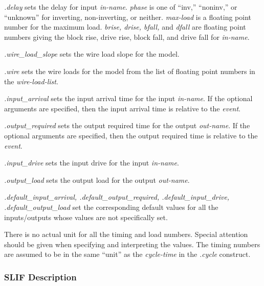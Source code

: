 {\begin{pespace}
\begin{description}
\item {\em .delay} sets the delay for input {\em in-name}.  {\em phase} is
one of ``{\sc inv},'' ``{\sc noninv},'' or ``{\sc unknown}'' for inverting,
non-inverting, or neither.  {\em max-load} is a floating point number for
the maximum load.  {\em brise, drise, bfall,} and {\em dfall} are floating
point numbers giving the block rise, drive rise, block fall, and drive fall
for {\em in-name}.

\item {\em .wire\_load\_slope} sets the wire load slope for the model.

\item {\em .wire} sets the wire loads for the model from the list of floating
point numbers in the {\em wire-load-list}.

\item {\em .input\_arrival} sets the input arrival time for the input {\em
in-name}.  If the optional arguments are specified, then the input arrival
time is relative to the {\em event}.

\item {\em .output\_required} sets the output required time for the output
{\em out-name}.  If the optional arguments are specified, then the output
required time is relative to the {\em event}.

\item {\em .input\_drive} sets the input drive for the input {\em in-name}.

\item {\em .output\_load} sets the output load for the output {\em out-name}.

\item {\em .default\_input\_arrival, .default\_output\_required,
.default\_input\_drive, .default\_output\_load} set the corresponding default
values for all the inputs/outputs whose values are not specifically set.
\end{description}

There is no actual unit for all the timing and load numbers.  Special
attention should be given when specifying and interpreting the values.  The
timing numbers are assumed to be in the same ``unit'' as the {\em
cycle-time} in the {\em .cycle} construct.

\subsubsection{SLIF Description}

\begin{center}
{\large

}
\end{center}
\end{pespace}}
